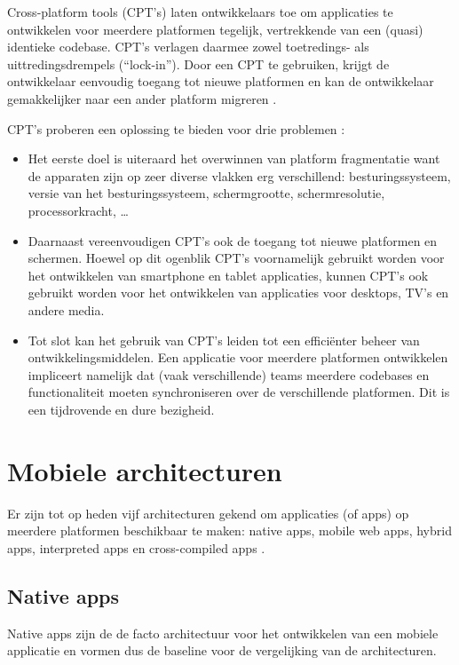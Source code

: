 \documentclass[a4paper]{IEEEconf}
\begin{document}
Cross-platform tools (CPT's) laten ontwikkelaars toe om applicaties te ontwikkelen voor meerdere platformen tegelijk, vertrekkende van een (quasi) identieke codebase. CPT's verlagen daarmee zowel toetredings- als uittredingsdrempels (``lock-in''). Door een CPT te gebruiken, krijgt de ontwikkelaar eenvoudig toegang tot nieuwe platformen en kan de ontwikkelaar gemakkelijker naar een ander platform migreren \cite{VMCPT:2012}.

CPT's proberen een oplossing te bieden voor drie problemen \cite{VMCPT:2012}:

\begin{itemize}
    \item Het eerste doel is uiteraard het overwinnen van platform fragmentatie want de apparaten zijn op zeer diverse vlakken erg verschillend: besturingssysteem, versie van het besturingssysteem, schermgrootte, schermresolutie, processorkracht, \ldots 
    \item Daarnaast vereenvoudigen CPT's ook de toegang tot nieuwe platformen en schermen. Hoewel op dit ogenblik CPT's voornamelijk gebruikt worden voor het ontwikkelen van smartphone en tablet applicaties, kunnen CPT's ook gebruikt worden voor het ontwikkelen van applicaties voor desktops, TV's en andere media.
    \item Tot slot kan het gebruik van CPT's leiden tot een effici\"enter beheer van ontwikkelingsmiddelen. Een applicatie voor meerdere platformen ontwikkelen impliceert namelijk dat (vaak verschillende) teams meerdere codebases en functionaliteit moeten synchroniseren over de verschillende platformen. Dit is een tijdrovende en dure bezigheid.
\end{itemize}

\section{Mobiele architecturen}

Er zijn tot op heden vijf architecturen gekend om applicaties (of apps) op meerdere platformen beschikbaar te maken: native apps, mobile web apps, hybrid apps, interpreted apps en cross-compiled apps \cite{Friese}.

\subsection{Native apps}

Native apps zijn de de facto architectuur voor het ontwikkelen van een mobiele applicatie en vormen dus de baseline voor de vergelijking van de architecturen. 
\end{document}
